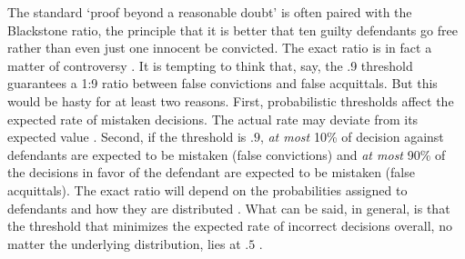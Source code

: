 \documentclass{article}
\begin{document}
 The standard
`proof beyond a reasonable doubt' is often paired with the Blackstone ratio, the principle that it is better that ten guilty defendants go free rather than even just one innocent be convicted. The exact ratio is in fact a matter of controversy \citep{voloch1997}.
It is tempting to think that, say, the .9 threshold guarantees a 1:9 ratio between false convictions and false acquittals. But this would be hasty for at least two reasons.
First, probabilistic thresholds affect the expected rate of mistaken decisions. The actual rate may deviate from its expected value \citep{Kaye1999Clarifying-the-}. Second, if the threshold is $.9$, \textit{at most} 10\% of decision against defendants are expected to be mistaken (false convictions) and \textit{at most} 90\% of the decisions in favor of the defendant are expected to be mistaken (false acquittals). The exact ratio will depend on the probabilities  assigned to defendants and how they are distributed  \citep{allen2014}. 
What can be said, in general, is that the threshold that minimizes the expected rate of incorrect decisions overall, no matter the underlying distribution, lies at $.5$ 
\citep[see][for a proof]{kaye1982limits, Kaye1999Clarifying-the-, cheng2015}. 







%
%
%
\end{document}
